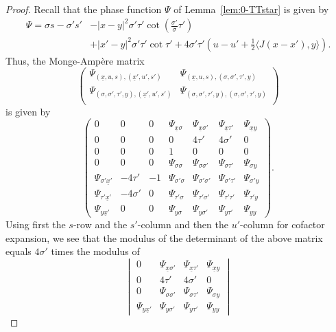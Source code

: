 \documentclass[leqno]{amsart}
\theoremstyle{definition}
\theoremstyle{remark}
\numberwithin{equation}{section}
\begin{document}
\begin{proof}

Recall that the phase function $\Psi$ of Lemma~\ref{lem:0-TTstar} is given by
\begin{align*}
\Psi = \sigma s - \sigma's' & - \left|x-y\right|^2\sigma'\tau' \cot(\tfrac{\sigma'}\sigma \tau') \\ 
& + \left|x'-y\right|^2\sigma' \tau' \cot \tau' + 4 \sigma'\tau'(u-u' + \tfrac12\langle J(x-x'),y \rangle).
\end{align*}
Thus, the Monge-Ampère matrix
\[
\begin{pmatrix}
\Psi_{(\underline x, u,s),(\underline x', u',s')} & \Psi_{(\underline x, u,s),(\sigma,\sigma',\tau',y)}\\
\Psi_{(\sigma,\sigma',\tau',y),(\underline x', u',s')} & \Psi_{(\sigma,\sigma',\tau',y),(\sigma,\sigma',\tau',y)}\\
\end{pmatrix}
\]
is given by
\[
\begin{pmatrix}
0 & 0 & 0 & \Psi_{\underline x\sigma} & \Psi_{\underline x\sigma'} & \Psi_{\underline x\tau'} & \Psi_{\underline xy} \\
0 & 0 & 0 & 0 & 4 \tau' & 4 \sigma' & 0 \\
0 & 0 & 0 & 1 & 0 & 0 & 0 \\
0 & 0 & 0 & \Psi_{\sigma\sigma} & \Psi_{\sigma\sigma'} & \Psi_{\sigma\tau'} & \Psi_{\sigma y} \\
\Psi_{\sigma'\underline x'} & - 4 \tau' & -1 & \Psi_{\sigma'\sigma} & \Psi_{\sigma'\sigma'} & \Psi_{\sigma'\tau'} & \Psi_{\sigma' y} \\
\Psi_{\tau'\underline x'} & - 4 \sigma' & 0 & \Psi_{\tau'\sigma} & \Psi_{\tau'\sigma'} & \Psi_{\tau'\tau'} & \Psi_{\tau' y} \\
\Psi_{y\underline x'} & 0 & 0 & \Psi_{y\sigma} & \Psi_{y\sigma'} & \Psi_{y\tau'} & \Psi_{yy} 
\end{pmatrix}.
\]
Using first the $s$-row and the $s'$-column and then the $u'$-column for cofactor expansion, we see that the modulus of the determinant of the above matrix equals $4 \sigma'$ times the modulus of
\[
\begin{vmatrix}
0 & \Psi_{\underline x\sigma'} & \Psi_{\underline x\tau'} & \Psi_{\underline xy} \\
0 & 4 \tau' & 4 \sigma' & 0 \\
0 & \Psi_{\sigma\sigma'} & \Psi_{\sigma \tau'} & \Psi_{\sigma y} \\
\Psi_{y\underline x'} & \Psi_{y\sigma'} & \Psi_{y \tau'} & \Psi_{y y}

\end{vmatrix}\]
\end{proof}
\end{document}
